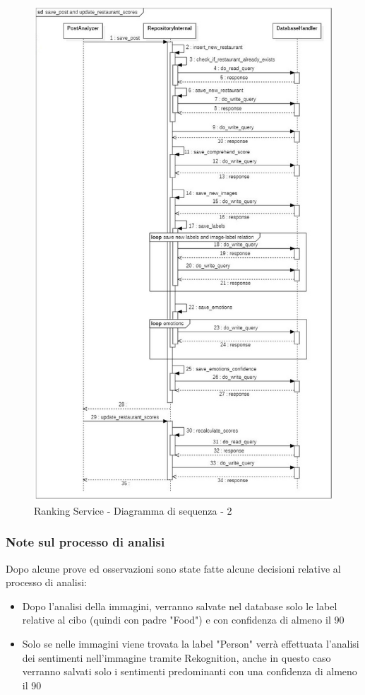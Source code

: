 \begin{figure}[H]
    \centering
    \includegraphics[scale=0.55]{Contenuto/Immagini/seq2-RS.JPG}
    \caption{Ranking Service - Diagramma di sequenza - 2}
\end{figure}

\subsubsection{Note sul processo di analisi}
Dopo alcune prove ed osservazioni sono state fatte alcune decisioni relative al processo di analisi:
\begin{itemize}
	\item Dopo l'analisi della immagini, verranno salvate nel database solo le label relative al cibo (quindi con padre "Food") e con confidenza di almeno il 90%
	\item Solo se nelle immagini viene trovata la label "Person" verrà effettuata l'analisi dei sentimenti nell'immagine tramite Rekognition, anche in questo caso verranno salvati solo i sentimenti predominanti con una confidenza di almeno il 90%
\end{itemize}


